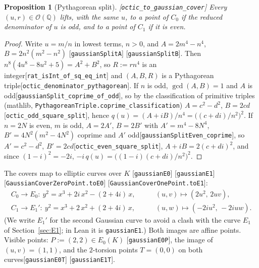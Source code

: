 \documentclass[10pt]{article}
\newtheorem{proposition}[theorem]{Proposition}
\theoremstyle{definition}
\theoremstyle{remark}
\newcommand{\Q}{\mathbb{Q}}
\newcommand{\leanref}[1]{{\scriptsize\textup{[\texttt{#1}]}}\allowbreak}
\begin{document}
\begin{proposition}[Pythagorean split]\label{prop:split}
\leanref{octic\_\allowbreak to\_\allowbreak gaussian\_\allowbreak cover}
Every $(u,r)\in\mathcal{O}(\Q)$ lifts, with the same $u$, to a point of
$C_0$ if the reduced denominator of $u$ is odd, and to a point of $C_1$ if it
is even.
\end{proposition}
\begin{proof}
Write $u=m/n$ in lowest terms, $n>0$, and $A=2m^4-n^4$, $B=2n^2(m^2-n^2)$
\leanref{gaussian\allowbreak Split\allowbreak A} \leanref{gaussian\allowbreak Split\allowbreak B}.  Then
$n^8(4u^8-8u^2+5)=A^2+B^2$, so $R:=rn^4$ is an integer\leanref{rat\_\allowbreak is\allowbreak Int\_\allowbreak of\_\allowbreak sq\_\allowbreak eq\_\allowbreak int}
and $(A,B,R)$ is a Pythagorean triple\leanref{octic\_\allowbreak denominator\_\allowbreak pythagorean}.
If $n$ is odd, $\gcd(A,B)=1$ and $A$ is odd\leanref{gaussian\allowbreak Split\_\allowbreak coprime\_\allowbreak of\_\allowbreak odd},
so by the classification of primitive triples (mathlib,
\texttt{Pythagorean\allowbreak Triple.coprime\_\allowbreak classification}) $A=c^2-d^2$, $B=2cd$
\leanref{octic\_\allowbreak odd\_\allowbreak square\_\allowbreak split}, hence $q(u)=(A+iB)/n^4=\bigl((c+di)/n^2\bigr)^2$.
If $n=2N$ is even, $m$ is odd, $A=2A'$, $B=2B'$ with $A'=m^4-8N^4$,
$B'=4N^2(m^2-4N^2)$ coprime and $A'$ odd\leanref{gaussian\allowbreak Split\allowbreak Even\_\allowbreak coprime},
so $A'=c^2-d^2$, $B'=2cd$\leanref{octic\_\allowbreak even\_\allowbreak square\_\allowbreak split}, $A+iB=2(c+di)^2$,
and since $(1-i)^2=-2i$, $-i\,q(u)=\bigl((1-i)(c+di)/n^2\bigr)^2$.
\end{proof}

The covers map to elliptic curves over $K$
\leanref{gaussian\allowbreak E0} \leanref{gaussian\allowbreak E1} \leanref{Gaussian\allowbreak Cover\allowbreak Zero\allowbreak Point.to\allowbreak E0} \leanref{Gaussian\allowbreak Cover\allowbreak One\allowbreak Point.to\allowbreak E1}:
\begin{align*}
 C_0\to E_0:\ y^2=x^3+2i\,x^2-(2+4i)\,x,&\qquad (u,v)\mapsto(2u^2,\,2uv),\\
 C_1\to E_1':\ y^2=x^3+2\,x^2+(2+4i)\,x,&\qquad (u,w)\mapsto(-2iu^2,\,-2iuw).
\end{align*}
(We write $E_1'$ for the second Gaussian curve to avoid a clash with the
curve $E_1$ of Section~\ref{sec:E1}; in Lean it is \texttt{gaussian\allowbreak E1}.)  Both
images are affine points.  Visible points: $P:=(2,2)\in E_0(K)$
\leanref{gaussian\allowbreak E0\allowbreak P}, the image of $(u,v)=(1,1)$, and the $2$-torsion points
$T=(0,0)$ on both curves\leanref{gaussian\allowbreak E0\allowbreak T} \leanref{gaussian\allowbreak E1\allowbreak T}.
\end{document}
